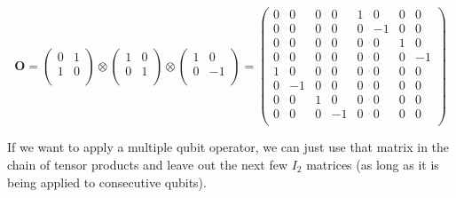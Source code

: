 \documentclass[11pt]{report}
\newcommand{\?}{\stackrel{?}{=}}
\begin{document}
$$\mathbf{O} = \begin{pmatrix}0 & 1 \\1 & 0 \\\end{pmatrix} \otimes \begin{pmatrix}1 & 0 \\0 & 1 \\\end{pmatrix} \otimes \begin{pmatrix}1 & 0 \\0 & -1 \\\end{pmatrix} = \begin{pmatrix}
0 & 0 & 0 & 0 & 1 & 0 & 0 & 0 \\
0 & 0 & 0 & 0 & 0 & -1 & 0 & 0 \\
0 & 0 & 0 & 0 & 0 & 0 & 1 & 0 \\
0 & 0 & 0 & 0 & 0 & 0 & 0 & -1 \\
1 & 0 & 0 & 0 & 0 & 0 & 0 & 0 \\
0 & -1 & 0 & 0 & 0 & 0 & 0 & 0 \\
0 & 0 & 1 & 0 & 0 & 0 & 0 & 0 \\
0 & 0 & 0 & -1 & 0 & 0 & 0 & 0 \\
\end{pmatrix}$$

If we want to apply a multiple qubit operator, we can just use that matrix in the chain of tensor products and leave out the next few $I_2$ matrices (as long as it is being applied to consecutive qubits). 
\end{document}
